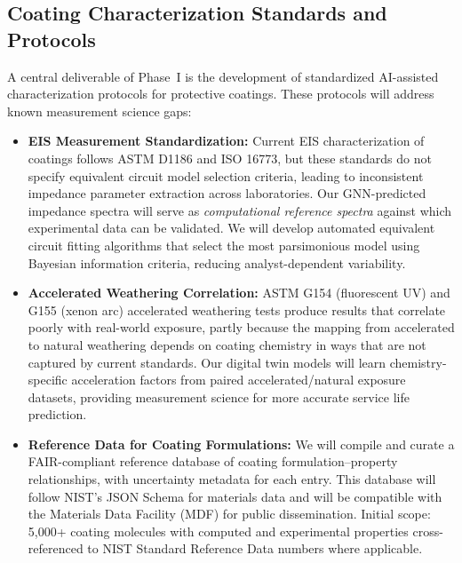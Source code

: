 \documentclass[11pt,letterpaper]{article}
\begin{document}
\subsection{Coating Characterization Standards and Protocols}

A central deliverable of Phase~I is the development of standardized AI-assisted characterization protocols for protective coatings. These protocols will address known measurement science gaps:

\begin{itemize}[leftmargin=*]
  \item \textbf{EIS Measurement Standardization:} Current EIS characterization of coatings follows ASTM D1186 and ISO 16773, but these standards do not specify equivalent circuit model selection criteria, leading to inconsistent impedance parameter extraction across laboratories. Our GNN-predicted impedance spectra will serve as \textit{computational reference spectra} against which experimental data can be validated. We will develop automated equivalent circuit fitting algorithms that select the most parsimonious model using Bayesian information criteria, reducing analyst-dependent variability.

  \item \textbf{Accelerated Weathering Correlation:} ASTM G154 (fluorescent UV) and G155 (xenon arc) accelerated weathering tests produce results that correlate poorly with real-world exposure, partly because the mapping from accelerated to natural weathering depends on coating chemistry in ways that are not captured by current standards. Our digital twin models will learn chemistry-specific acceleration factors from paired accelerated/natural exposure datasets, providing measurement science for more accurate service life prediction.

  \item \textbf{Reference Data for Coating Formulations:} We will compile and curate a FAIR-compliant reference database of coating formulation--property relationships, with uncertainty metadata for each entry. This database will follow NIST's JSON Schema for materials data and will be compatible with the Materials Data Facility (MDF) for public dissemination. Initial scope: 5,000+ coating molecules with computed and experimental properties cross-referenced to NIST Standard Reference Data numbers where applicable.
\end{itemize}

\end{document}
